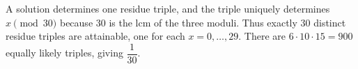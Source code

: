 A solution determines one residue triple, and the triple uniquely determines $x\pmod{30}$ because $30$ is the lcm of the three moduli. Thus exactly $30$ distinct residue triples are attainable, one for each $x=0,\ldots,29$. There are $6\cdot10\cdot15=900$ equally likely triples, giving $\boxed{\dfrac{1}{30}}$.
